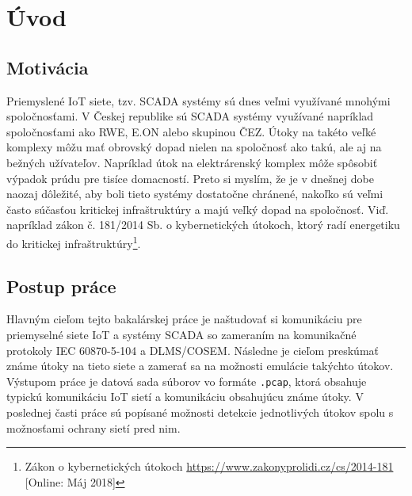 \chapter{Úvod}
\label{uvod}
\section{Motivácia}
\tab Priemyslené IoT siete, tzv. SCADA systémy sú dnes veľmi využívané mnohými spoločnosťami. V Českej republike sú SCADA systémy využívané napríklad spoločnosťami ako RWE, E.ON alebo skupinou ČEZ. Útoky na takéto veľké komplexy môžu mať obrovský dopad nielen na spoločnosť ako takú, ale aj na bežných užívateľov. Napríklad útok na elektrárenský komplex môže spôsobiť výpadok prúdu pre tisíce domacností. Preto si myslím, že je v dnešnej dobe naozaj dôležité, aby boli tieto systémy dostatočne chránené, nakoľko sú veľmi často súčasťou kritickej infraštruktúry a majú veľký dopad na spoločnosť. Viď. napríklad zákon č. 181/2014 Sb. o kybernetických útokoch, ktorý radí energetiku do kritickej infraštruktúry\footnote{Zákon o kybernetických útokoch \url{https://www.zakonyprolidi.cz/cs/2014-181} [Online: Máj 2018]}.
\section{Postup práce}
\tab Hlavným cieľom tejto bakalárskej práce je naštudovať si komunikáciu pre priemyselné siete IoT a systémy SCADA so zameraním na komunikačné protokoly IEC 60870-5-104 a DLMS/COSEM. Následne je cieľom preskúmať známe útoky na tieto siete a zamerať sa na možnosti emulácie takýchto útokov. Výstupom práce je datová sada súborov vo formáte {\tt .pcap}, ktorá obsahuje typickú komunikáciu IoT sietí a komunikáciu obsahujúcu známe útoky. V poslednej časti práce sú popísané možnosti detekcie jednotlivých útokov spolu s možnosťami ochrany sietí pred nim.
